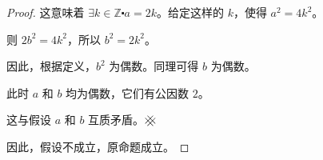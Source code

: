\begin{example}
\begin{center}
{{\begin{proof}
                    这意味着 $\exists k \in \mathbb{Z} \centerdot a = 2k$。给定这样的 $k$，使得 $a^2 = 4k^2$。

                    则 $2b^2 = 4k^2$，所以 $b^2 = 2k^2$。

                    因此，根据定义，$b^2$ 为偶数。同理可得 $b$ 为偶数。

                    此时 $a$ 和 $b$ 均为偶数，它们有公因数 $2$。

                    这与假设 $a$ 和 $b$ 互质矛盾。$\hashx$

                    因此，假设不成立，原命题成立。
                \end{proof}
            }
        }
    \end{center}
\end{example}
